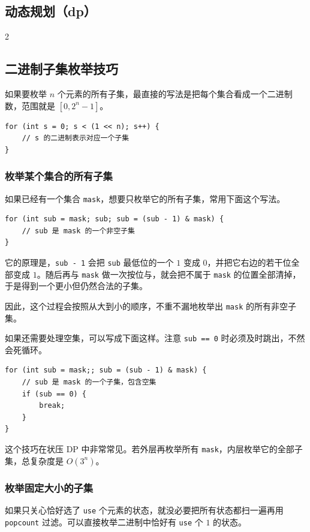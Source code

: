 	\begin{center}
		\section{动态规划（dp）}
	\end{center}

	\begin{multicols*}{2}

		\subsection{二进制子集枚举技巧}
		如果要枚举 $n$ 个元素的所有子集，最直接的写法是把每个集合看成一个二进制数，范围就是 $[0, 2^n - 1]$。

		\begin{verbatim}
for (int s = 0; s < (1 << n); s++) {
	// s 的二进制表示对应一个子集
}
		\end{verbatim}

		\subsubsection{枚举某个集合的所有子集}
		如果已经有一个集合 \texttt{mask}，想要只枚举它的所有子集，常用下面这个写法。

		\begin{verbatim}
for (int sub = mask; sub; sub = (sub - 1) & mask) {
	// sub 是 mask 的一个非空子集
}
		\end{verbatim}

		它的原理是，\texttt{sub - 1} 会把 \texttt{sub} 最低位的一个 $1$ 变成 $0$，并把它右边的若干位全部变成 $1$。随后再与 \texttt{mask} 做一次按位与，就会把不属于 \texttt{mask} 的位置全部清掉，于是得到一个更小但仍然合法的子集。

		因此，这个过程会按照从大到小的顺序，不重不漏地枚举出 \texttt{mask} 的所有非空子集。

		如果还需要处理空集，可以写成下面这样。注意 \texttt{sub == 0} 时必须及时跳出，不然会死循环。

		\begin{verbatim}
for (int sub = mask;; sub = (sub - 1) & mask) {
	// sub 是 mask 的一个子集，包含空集
	if (sub == 0) {
		break;
	}
}
		\end{verbatim}

		这个技巧在状压 DP 中非常常见。若外层再枚举所有 \texttt{mask}，内层枚举它的全部子集，总复杂度是 $O(3^n)$。

		\subsubsection{枚举固定大小的子集}
		如果只关心恰好选了 \texttt{use} 个元素的状态，就没必要把所有状态都扫一遍再用 \texttt{popcount} 过滤。可以直接枚举二进制中恰好有 \texttt{use} 个 $1$ 的状态。


\end{multicols*}
